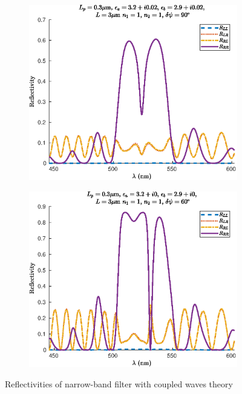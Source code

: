\begin{figure}
\begin{subfigure}{0.49\linewidth}
	\end{subfigure}
	\begin{subfigure}{0.49\linewidth}
		\includegraphics[width=\linewidth]{plots/defect/reflectivity_losses/cwt_reflection}
		\caption{}
	\end{subfigure}
	\begin{subfigure}{0.49\linewidth}
		\includegraphics[width=\linewidth]{plots/defect/reflectivity_other_defect/cwt_reflection}
		\caption{}
	\end{subfigure}
	\caption[Reflectivity of the narrow-band filter]{Reflectivities of narrow-band filter with coupled waves theory}
	\label{fig:reflectivities_narrow_appendix}
\end{figure}

